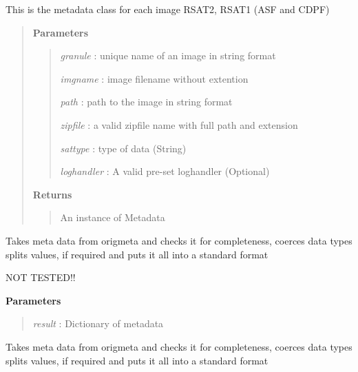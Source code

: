 \documentclass[letterpaper,10pt,openany,oneside]{sphinxmanual}
\begin{document}
\begin{fulllineitems}
\label{code:Metadata.Metadata}
This is the metadata class for each image RSAT2, RSAT1 (ASF and CDPF)
\begin{quote}

\textbf{Parameters}
\begin{quote}

\emph{granule} : unique name of an image in string format

\emph{imgname} : image filename without extention

\emph{path} : path to the image in string format

\emph{zipfile} : a valid zipfile name with full path and extension

\emph{sattype}    : type of data (String)

\emph{loghandler} : A valid pre-set loghandler (Optional)
\end{quote}

\textbf{Returns}
\begin{quote}

An instance of Metadata
\end{quote}
\end{quote}

\begin{fulllineitems}
\label{code:Metadata.Metadata.clean_metaASF}
Takes meta data from origmeta and checks it for completeness, coerces data types
splits values, if required and puts it all into a standard format

NOT TESTED!!

\textbf{Parameters}
\begin{quote}

\emph{result} : Dictionary of metadata
\end{quote}

\end{fulllineitems}


\begin{fulllineitems}
\label{code:Metadata.Metadata.clean_metaCDPF}
Takes meta data from origmeta and checks it for completeness, coerces data types
splits values, if required and puts it all into a standard format


\end{fulllineitems}
\end{fulllineitems}
\end{document}
